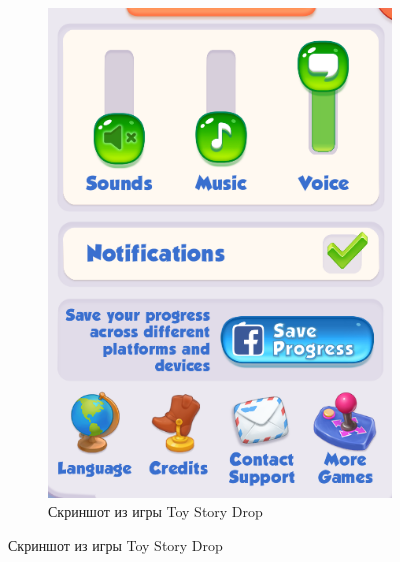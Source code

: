 \documentclass[10pt, unicode]{beamer}
\begin{document}
\begin{frame}
\begin{figure}[h]
\begin{subfigure}[h]{0.4\textwidth}
                \includegraphics[width=\textwidth]{images/ToyStoryDropScreenshot.png}
                \caption{Скриншот из игры Toy Story Drop}
            \end{subfigure}
        \end{figure}
    \end{frame}
\end{document}
